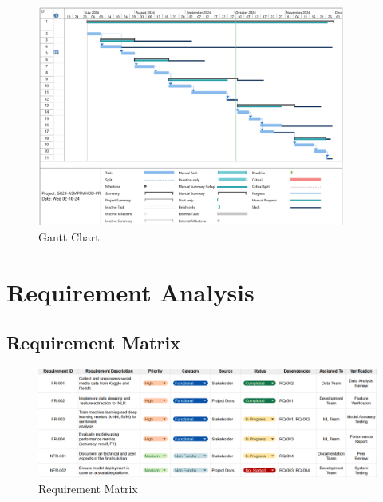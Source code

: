 \vspace{2cm}

\begin{figure}[h!]  
    \centering
    \includegraphics[width=0.9\textwidth]{Images/Gantt Chart.png}  
    \caption{Gantt Chart}
    \label{Gantt Chart}  %
\end{figure}




\section{Requirement Analysis}

\subsection{Requirement Matrix}
\begin{figure}[h!]  
    \centering
    \includegraphics[width=1.0\textwidth]{Images/Requirement Matrix.png}  
    \caption{Requirement Matrix}
    \label{Requirement Matrix}  %
\end{figure}

